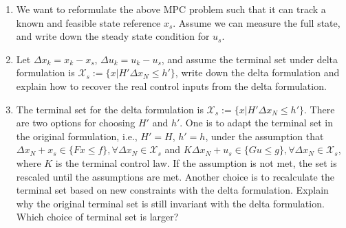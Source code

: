\begin{enumerate}
    \item \label{ex6:1} We want to reformulate the above MPC problem such that it can track a known and feasible state reference $x_s$. Assume we can measure the full state, and write down the steady state condition for $u_s$.


    \item Let $\Delta x_k = x_k - x_s$, $\Delta u_k = u_k-u_s$, and assume the terminal set under delta formulation is $\mathcal{X}_s:=\{x|H'\Delta x_N\leq h'\}$, write down the delta formulation and explain how to recover the real control inputs from the delta formulation.


    \item The terminal set for the delta formulation is $\mathcal{X}_s:=\{x|H'\Delta x_N\leq h'\}$. There are two options for choosing $H'$ and $h'$. One is to adapt the terminal set in the original formulation, i.e., $H' = H$, $h' = h$, under the assumption that $\Delta x_N+x_s \in \{Fx\leq f\}, \forall \Delta x_N \in \mathcal{X}_s$ and $K\Delta x_N+u_s \in \{Gu\leq g\}, \forall \Delta x_N \in \mathcal{X}_s$, where $K$ is the terminal control law. If the assumption is not met, the set is rescaled until the assumptions are met. Another choice is to recalculate the terminal set based on new constraints with the delta formulation. Explain why the original terminal set is still invariant with the delta formulation. Which choice of terminal set is larger?


\end{enumerate}
